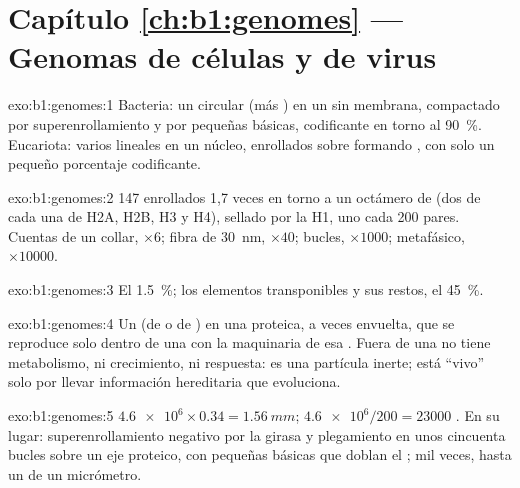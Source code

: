 \section*{Capítulo \ref{ch:b1:genomes} --- Genomas de células y de virus}

\begin{solution}{exo:b1:genomes:1}
Bacteria: un  circular (más ) en un  sin
membrana, compactado por superenrollamiento y por pequeñas 
básicas, codificante en torno al \qty{90}{\%}. Eucariota: varios 
lineales en un núcleo, enrollados sobre  formando , con
solo un pequeño porcentaje codificante.
\end{solution}

\begin{solution}{exo:b1:genomes:2}
147  enrollados 1,7 veces en torno a un octámero de 
(dos de cada una de H2A, H2B, H3 y H4), sellado por la H1, uno cada 200
pares. Cuentas de un collar, $\times 6$; fibra de \qty{30}{nm}, $\times 40$;
bucles, $\times 1000$;  metafásico, $\times \num{10000}$.
\end{solution}

\begin{solution}{exo:b1:genomes:3}
El \qty{1.5}{\%}; los elementos transponibles y sus restos, el \qty{45}{\%}.
\end{solution}

\begin{solution}{exo:b1:genomes:4}
Un  (de  o de ) en una  proteica, a veces envuelta, que
se reproduce solo dentro de una  con la maquinaria de esa .
Fuera de una  no tiene metabolismo, ni crecimiento, ni respuesta: es
una partícula inerte; está ``vivo'' solo por llevar información hereditaria
que evoluciona.
\end{solution}

\begin{solution}{exo:b1:genomes:5}
$\num{4.6e6}\times 0.34 = \qty{1.56}{mm}$; $\num{4.6e6}/200 = \num{23000}$
. En su lugar: superenrollamiento negativo por la girasa y
plegamiento en unos cincuenta bucles sobre un eje proteico, con pequeñas
 básicas que doblan el ; mil veces, hasta un  de un
micrómetro.
\end{solution}

